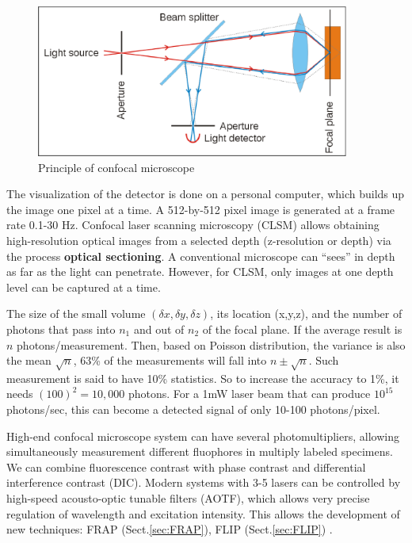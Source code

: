  \begin{figure}[hbt]
  \centerline{\includegraphics[height=5cm,
    angle=0]{./images/confocal_microscope.eps}}
\caption{Principle of confocal microscope}
\label{fig:confocal_microscope}
\end{figure}


The visualization of the detector is done on a personal computer, which builds
up the image one pixel at a time. A 512-by-512 pixel image is generated at a
frame rate 0.1-30 Hz. Confocal laser scanning microscopy (CLSM) allows
obtaining high-resolution optical images from a selected depth (z-resolution or
depth) via the process {\bf optical sectioning}. A conventional microscope can
``sees'' in depth as far as the light can penetrate. However, for CLSM, only
images at one depth level can be captured at a time.


The size of the small volume $(\delta x, \delta y, \delta z)$, its location
(x,y,z), and the number of photons that pass into $n_1$ and out of $n_2$ of the
focal plane. If the average result is $n$ photons/measurement. Then, based on
Poisson distribution, the variance is also the mean $\sqrt{n}$, 63\% of the
measurements will fall into $n\pm \sqrt{n}$. Such measurement is said to have
10\% statistics. So to increase the accuracy to 1\%, it needs $(100)^2=10,000$
photons. For a 1mW laser beam that can produce $10^{15}$ photons/sec, this can
become a detected signal of only 10-100 photons/pixel. 

High-end confocal microscope system can have several photomultipliers, allowing
simultaneously measurement different fluophores in multiply labeled specimens.
We can combine fluorescence contrast with phase contrast and differential
interference contrast (DIC). Modern systems with 3-5 lasers can be controlled by
high-speed acousto-optic tunable filters (AOTF), which allows very precise
regulation of wavelength and excitation intensity. This allows the development
of new techniques: FRAP (Sect.\ref{sec:FRAP}), FLIP (Sect.\ref{sec:FLIP}) .

